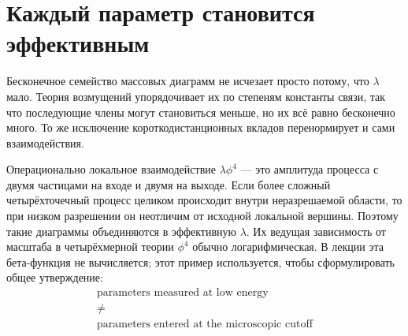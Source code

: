 \begin{classroomqa}
\end{classroomqa}

\section{Каждый параметр становится эффективным}

Бесконечное семейство массовых диаграмм не исчезает просто потому, что \(\lambda\) мало. Теория возмущений упорядочивает их по степеням константы связи, так что последующие члены могут становиться меньше, но их всё равно бесконечно много. То же исключение короткодистанционных вкладов перенормирует и сами взаимодействия.

\begin{classroomqa}
\end{classroomqa}

Операционально локальное взаимодействие \(\lambda\phi^4\) — это амплитуда процесса с двумя частицами на входе и двумя на выходе. Если более сложный четырёхточечный процесс целиком происходит внутри неразрешаемой области, то при низком разрешении он неотличим от исходной локальной вершины. Поэтому такие диаграммы объединяются в эффективную \(\lambda\). Их ведущая зависимость от масштаба в четырёхмерной теории \(\phi^4\) обычно логарифмическая. В лекции эта бета-функция не вычисляется; этот пример используется, чтобы сформулировать общее утверждение:
\begin{equation}
\begin{gathered}
\text{parameters measured at low energy}\\
\ne\\
\text{parameters entered at the microscopic cutoff}
\end{gathered}
\end{equation}

